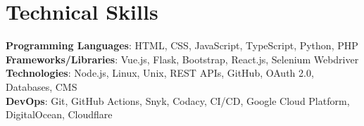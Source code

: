 \section{Technical Skills}
 \begin{itemize}[leftmargin=0.15in, label={}]
    \small{\item{
     \textbf{Programming Languages}{: HTML, CSS, JavaScript, TypeScript, Python, PHP} \\
     \textbf{Frameworks/Libraries}{: Vue.js, Flask, Bootstrap, React.js, Selenium Webdriver} \\
     \textbf{Technologies}{: Node.js, Linux, Unix, REST APIs, GitHub, OAuth 2.0, Databases, CMS } \\
     \textbf{DevOps}{: Git, GitHub Actions, Snyk, Codacy, CI/CD, Google Cloud Platform, DigitalOcean, Cloudflare }
    }}
 \end{itemize}  